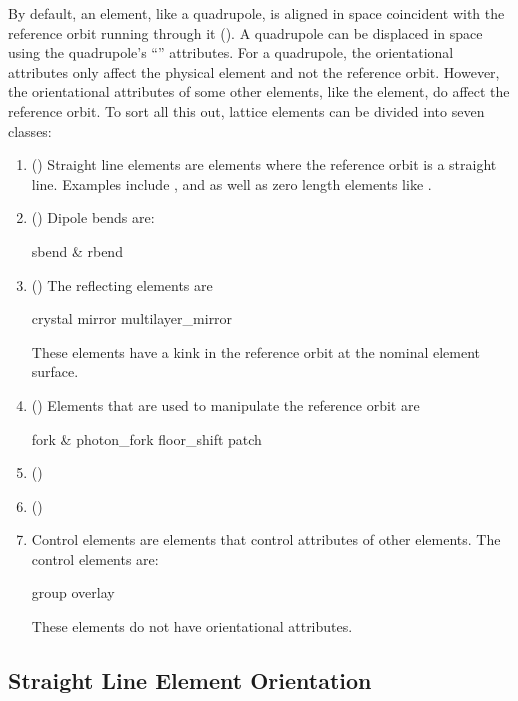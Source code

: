 By default, an element, like a quadrupole, is aligned in space
coincident with the reference orbit running through it
(). A quadrupole can be displaced in space using
the quadrupole's ``'' attributes. For a quadrupole,
the orientational attributes only affect the physical element and not
the reference orbit. However, the orientational attributes of some
other elements, like the  element, do affect the
reference orbit. To sort all this out, lattice elements can be divided
into seven classes:
  \begin{enumerate}
  \item{} () \Newline
Straight line elements are elements where the reference orbit is a
straight line. Examples include , and 
as well as zero length elements like .
  \item{} () \Newline
Dipole bends are:
\begin{example}
  sbend \& rbend
\end{example}
  \item{} () \Newline
The reflecting elements are
\begin{example}
  crystal
  mirror
  multilayer_mirror
\end{example}
These elements have a kink in the reference orbit at the nominal
element surface.
  \item{} () \Newline
Elements that are used to manipulate the reference orbit are
\begin{example}
  fork \& photon_fork
  floor_shift
  patch
\end{example}
  \item{} () \Newline
  \item{} () \Newline
  \item{} \Newline
Control elements are elements that control attributes of other
elements. The control elements are:
\begin{example}
  group
  overlay
\end{example}
These elements do not have orientational attributes.
  \end{enumerate}

\subsection{Straight Line Element Orientation}
\label{s:straight.orient}

